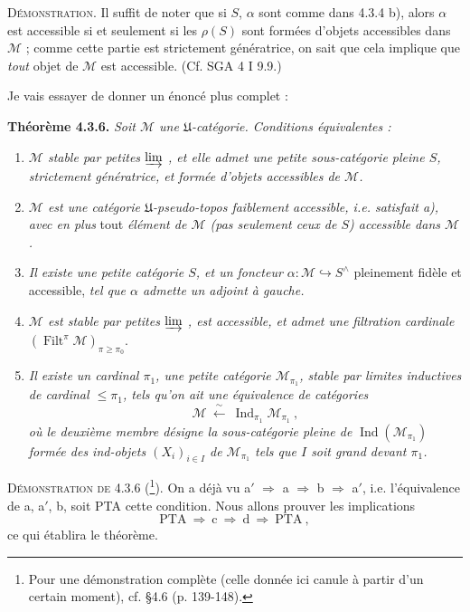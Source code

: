 \documentclass[11pt]{article}
\newcommand{\printedpage}[1]{\marginpar{\footnotesize p.~#1}}
\newcommand{\msp}[1]{\marginpar{\footnotesize [#1]}}
\newcommand{\Filt}{\operatorname{Filt}}
\newcommand{\Ind}{\operatorname{Ind}}
\begin{document}
\noindent\msp{page 70}\textsc{Démonstration}. Il suffit de noter que si $S$, $\alpha$ sont comme dans 4.3.4 b), alors $\alpha$ est accessible si et seulement si les $\rho(S)$ sont formées d'objets accessibles dans $\mathcal M$ ; comme cette partie est strictement génératrice, on sait que cela implique que \textit{tout} objet de $\mathcal M$ est accessible. (Cf. SGA 4 I 9.9.)

\noindent Je vais essayer de donner un énoncé plus complet :

\noindent\textbf{Théorème 4.3.6.} \textit{Soit $\mathcal M$ une $\mathfrak U$-catégorie. Conditions équivalentes :}
\begin{enumerate}[label={}]
\item[\textit{a)}] \textit{$\mathcal M$ stable par petites $\varinjlim$ , et elle admet une petite sous-catégorie pleine $S$, strictement génératrice, et formée d'objets accessibles de $\mathcal M$.}
\item[\textit{a$'$)}] \textit{$\mathcal M$ est une catégorie $\mathfrak U$-pseudo-topos faiblement accessible, i.e. satisfait a), avec en plus} tout \textit{élément de $\mathcal M$ (pas seulement ceux de $S$) accessible dans $\mathcal M$.}
\item[\textit{b)}] \textit{Il existe une petite catégorie $S$, et un foncteur $\alpha:\mathcal M\hookrightarrow S^\wedge$} pleinement fidèle et accessible, \textit{tel que $\alpha$ admette un adjoint à gauche.}
\item[\textit{c)}] \msp{page 71}\textit{$\mathcal M$ est stable par petites $\varinjlim$ , est accessible, et admet une filtration cardinale} $(\Filt^\pi\mathcal M)_{\pi\geqslant\pi_0}$.
\item[\textit{d)}] \textit{Il existe un cardinal $\pi_1$, une petite catégorie $\mathcal M_{\pi_1}$, stable par limites inductives de cardinal $\leqslant\pi_1$, tels qu'on ait une équivalence de catégories}
\[
\mathcal M\ \xleftarrow{\ \sim\ }\ \Ind_{\pi_1}\mathcal M_{\pi_1}\ ,
\tag*{(4.3.6.1)}
\]
\textit{où le deuxième membre désigne la sous-catégorie pleine de} $\Ind(\mathcal M_{\pi_1})$ \textit{formée des ind-objets $(X_i)_{i\in I}$ de $\mathcal M_{\pi_1}$ tels que $I$ soit grand devant $\pi_1$.}
\end{enumerate}

\noindent\textsc{Démonstration de} 4.3.6 (\footnote{Pour une démonstration complète (celle donnée ici canule à partir d'un certain moment), cf. §4.6 (p. 139-148).}). On a déjà vu a$'$ $\Longrightarrow$ a $\Longrightarrow$ b $\Longrightarrow$ a$'$, i.e. l'équivalence de a, a$'$, b, soit PTA cette condition. Nous allons prouver les implications
\[
\mathrm{PTA}\ \Longrightarrow\ \mathrm{c}\ \Longrightarrow\ \mathrm{d}\ \Longrightarrow\ \mathrm{PTA}\ ,
\]
\printedpage{12}%
ce qui établira le théorème.
\end{document}
